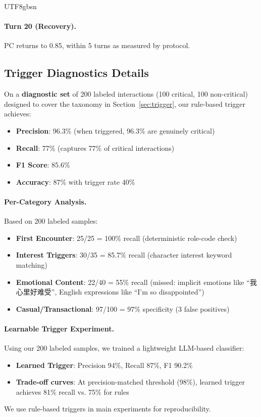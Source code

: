 \documentclass[11pt]{article}
\begin{document}
\begin{CJK*}{UTF8}{gbsn}
\paragraph{Turn 20 (Recovery).}
PC returns to 0.85, within 5 turns as measured by protocol.

\subsection{Trigger Diagnostics Details}
\label{sec:trigger_details}

On a \textbf{diagnostic set} of 200 labeled interactions (100 critical, 100 non-critical) designed to cover the taxonomy in Section~\ref{sec:trigger}, our rule-based trigger achieves:
\begin{itemize}
    \item \textbf{Precision}: 96.3\% (when triggered, 96.3\% are genuinely critical)
    \item \textbf{Recall}: 77\% (captures 77\% of critical interactions)
    \item \textbf{F1 Score}: 85.6\%
    \item \textbf{Accuracy}: 87\% with trigger rate 40\%
\end{itemize}

\paragraph{Per-Category Analysis.} Based on 200 labeled samples:
\begin{itemize}
    \item \textbf{First Encounter}: 25/25 = 100\% recall (deterministic role-code check)
    \item \textbf{Interest Triggers}: 30/35 = 85.7\% recall (character interest keyword matching)
    \item \textbf{Emotional Content}: 22/40 = 55\% recall (missed: implicit emotions like ``我心里好难受'', English expressions like ``I'm so disappointed'')
    \item \textbf{Casual/Transactional}: 97/100 = 97\% specificity (3 false positives)
\end{itemize}

\paragraph{Learnable Trigger Experiment.} Using our 200 labeled samples, we trained a lightweight LLM-based classifier:
\begin{itemize}
    \item \textbf{Learned Trigger}: Precision 94\%, Recall 87\%, F1 90.2\%
    \item \textbf{Trade-off curves}: At precision-matched threshold (98\%), learned trigger achieves 81\% recall vs. 75\% for rules
\end{itemize}
We use rule-based triggers in main experiments for reproducibility.


\end{CJK*}
\end{document}
